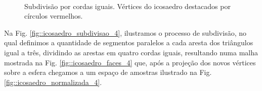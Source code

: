 \documentclass[
    12pt,                %
    oneside,            %
    a4paper,            %
    english,            %
    french,                %
    spanish,            %
    brazil                %
    ]{abntex2}
\begin{document}
\begin{figure}[H]
    \centering
    \\
    \caption{Subdivisão por cordas iguais. Vértices do icosaedro destacados por círculos vermelhos.
    }
    \label{fig::triangle_subdivisao}
\end{figure}


Na Fig. \ref{fig::icosaedro_subdivisao_4}, ilustramos o processo de subdivisão, no qual definimos a quantidade de segmentos paralelos a cada aresta dos triângulos igual a três, dividindo as arestas em quatro cordas iguais, resultando numa malha mostrada na Fig. \ref{fig::icosaedro_faces_4} que, após a projeção dos novos vértices sobre a esfera chegamos a um espaço de amostras ilustrado na Fig. \ref{fig::icosaedro_normalizada_4}.
\end{document}

